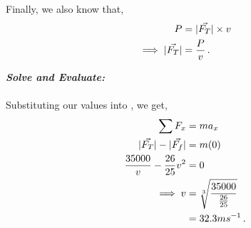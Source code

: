 \begin{subquestions}
\begin{subsubquestions}
Finally, we also know that,
\begin{align}
	P & = |\vec{F_T}|\times v \nonumber \\
	\implies |\vec{F_T}| & = \frac{P}{v} \,. \label{2009:q5:PEqn2}
\end{align}
	



\textbf{\textit{Solve and Evaluate:}} \\ \\
Substituting our values into , we get,
\begin{align}
	\sum F_x & = ma_x \nonumber \\
	|\vec{F_T}|-|\vec{F_f}| & = m(0) \nonumber \\
	\frac{35000}{v} - \frac{26}{25}v^2 & = 0 \nonumber \\
	\implies v & = \sqrt[3]{\frac{35000}{\frac{26}{25}}} \nonumber \\
	           & = 32.3 ms^{-1} \,.
\end{align}

\end{subsubquestions}
	
\end{subquestions}










